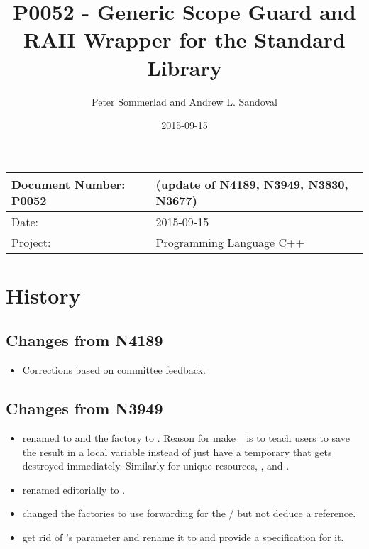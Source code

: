 \documentclass[ebook,11pt,article]{memoir}
\title{P0052 - Generic Scope Guard and RAII Wrapper for the Standard Library}
\author{Peter Sommerlad and Andrew L. Sandoval}
\date{2015-09-15}                                           %
\begin{document}
\maketitle
\begin{tabular}[t]{|l|l|}\hline 
Document Number: P0052 &   (update of N4189, N3949, N3830, N3677)\\\hline
Date: & 2015-09-15 \\\hline
Project: & Programming Language C++\\\hline 
\end{tabular}

\chapter{History}
\section{Changes from N4189}
\begin{itemize}
\item Corrections based on committee feedback.
\end{itemize}

\section{Changes from N3949}
\begin{itemize}
\item renamed  to  and the factory to . Reason for make_ is to teach users to save the result in a local variable instead of just have a temporary that gets destroyed immediately. Similarly for unique resources, ,  and .
\item renamed editorially  to .
\item changed the factories to use forwarding for the / but not deduce a reference.
\item get rid of 's parameter and rename it to  and provide a  specification for it.
\end{itemize}
\end{document}
